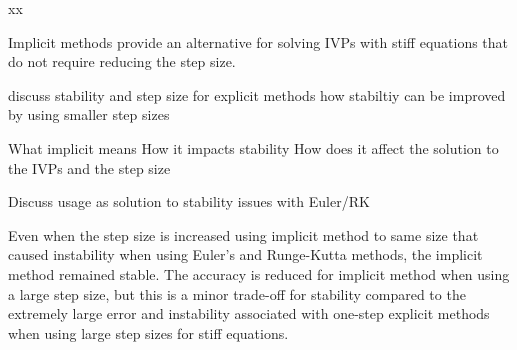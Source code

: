\documentclass{article}
\begin{document}
xx

Implicit methods provide an alternative for solving IVPs with stiff equations that do not require reducing the step size.


discuss stability and step size for explicit methods
how stabiltiy can be improved by using smaller step sizes

What implicit means
How it impacts stability
How does it affect the solution to the IVPs and the step size

Discuss usage as solution to stability issues with Euler/RK

Even when the step size is increased using implicit method to same size that caused instability when using Euler's and Runge-Kutta methods, the implicit method remained stable. The accuracy is reduced for implicit method when using a large step size, but this is a minor trade-off for stability compared to the extremely large error and instability associated with one-step explicit methods when using large step sizes for stiff equations.
\end{document}
